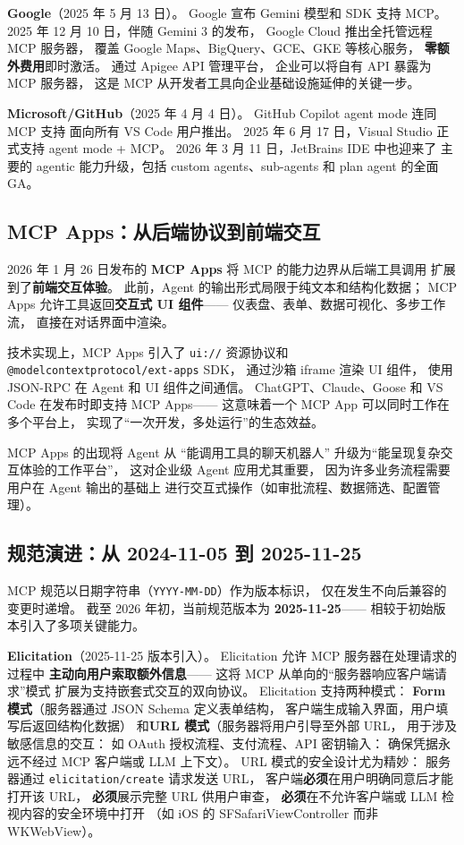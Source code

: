 \textbf{Google}（2025 年 5 月 13 日）。
Google 宣布 Gemini 模型和 SDK 支持 MCP。
2025 年 12 月 10 日，伴随 Gemini 3 的发布，
Google Cloud 推出全托管远程 MCP 服务器，
覆盖 Google Maps、BigQuery、GCE、GKE 等核心服务，
\textbf{零额外费用}即时激活。
通过 Apigee API 管理平台，
企业可以将自有 API 暴露为 MCP 服务器，
这是 MCP 从开发者工具向企业基础设施延伸的关键一步。

\textbf{Microsoft/GitHub}（2025 年 4 月 4 日）。
GitHub Copilot agent mode 连同 MCP 支持
面向所有 VS Code 用户推出。
2025 年 6 月 17 日，Visual Studio 正式支持 agent mode + MCP。
2026 年 3 月 11 日，JetBrains IDE 中也迎来了
主要的 agentic 能力升级，包括 custom agents、sub-agents
和 plan agent 的全面 GA。

\subsection{MCP Apps：从后端协议到前端交互}

2026 年 1 月 26 日发布的 \textbf{MCP Apps}
将 MCP 的能力边界从后端工具调用
扩展到了\textbf{前端交互体验}。
此前，Agent 的输出形式局限于纯文本和结构化数据；
MCP Apps 允许工具返回\textbf{交互式 UI 组件}——
仪表盘、表单、数据可视化、多步工作流，
直接在对话界面中渲染。

技术实现上，MCP Apps 引入了
\texttt{ui://} 资源协议和
\texttt{@modelcontextprotocol/ext-apps} SDK，
通过沙箱 iframe 渲染 UI 组件，
使用 JSON-RPC 在 Agent 和 UI 组件之间通信。
ChatGPT、Claude、Goose 和 VS Code
在发布时即支持 MCP Apps——
这意味着一个 MCP App 可以同时工作在多个平台上，
实现了“一次开发，多处运行”的生态效益。

MCP Apps 的出现将 Agent 从
“能调用工具的聊天机器人”
升级为“能呈现复杂交互体验的工作平台”，
这对企业级 Agent 应用尤其重要，
因为许多业务流程需要用户在 Agent 输出的基础上
进行交互式操作（如审批流程、数据筛选、配置管理）。

\subsection{规范演进：从 2024-11-05 到 2025-11-25}

MCP 规范以日期字符串（\texttt{YYYY-MM-DD}）作为版本标识，
仅在发生不向后兼容的变更时递增。
截至 2026 年初，当前规范版本为 \textbf{2025-11-25}——
相较于初始版本引入了多项关键能力。

\textbf{Elicitation}（2025-11-25 版本引入）。
Elicitation 允许 MCP 服务器在处理请求的过程中
\textbf{主动向用户索取额外信息}——
这将 MCP 从单向的“服务器响应客户端请求”模式
扩展为支持嵌套式交互的双向协议。
Elicitation 支持两种模式：
\textbf{Form 模式}（服务器通过 JSON Schema 定义表单结构，
客户端生成输入界面，用户填写后返回结构化数据）
和\textbf{URL 模式}（服务器将用户引导至外部 URL，
用于涉及敏感信息的交互：
如 OAuth 授权流程、支付流程、API 密钥输入：
确保凭据永远不经过 MCP 客户端或 LLM 上下文）。
URL 模式的安全设计尤为精妙：
服务器通过 \texttt{elicitation/create} 请求发送 URL，
客户端\textbf{必须}在用户明确同意后才能打开该 URL，
\textbf{必须}展示完整 URL 供用户审查，
\textbf{必须}在不允许客户端或 LLM 检视内容的安全环境中打开
（如 iOS 的 SFSafariViewController 而非 WKWebView）。

